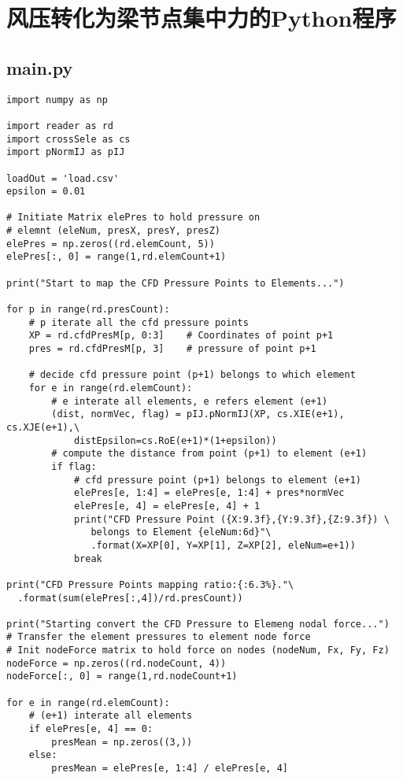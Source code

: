 \chapter{风压转化为梁节点集中力的Python程序}\label{apen:load}

\section{main.py}
\begin{verbatim}
import numpy as np

import reader as rd
import crossSele as cs
import pNormIJ as pIJ

loadOut = 'load.csv'
epsilon = 0.01

# Initiate Matrix elePres to hold pressure on
# elemnt (eleNum, presX, presY, presZ)
elePres = np.zeros((rd.elemCount, 5))
elePres[:, 0] = range(1,rd.elemCount+1)

print("Start to map the CFD Pressure Points to Elements...")

for p in range(rd.presCount):
    # p iterate all the cfd pressure points
    XP = rd.cfdPresM[p, 0:3]    # Coordinates of point p+1
    pres = rd.cfdPresM[p, 3]    # pressure of point p+1
    
    # decide cfd pressure point (p+1) belongs to which element
    for e in range(rd.elemCount):
        # e interate all elements, e refers element (e+1)
        (dist, normVec, flag) = pIJ.pNormIJ(XP, cs.XIE(e+1), cs.XJE(e+1),\
            distEpsilon=cs.RoE(e+1)*(1+epsilon))   
        # compute the distance from point (p+1) to element (e+1)
        if flag:
            # cfd pressure point (p+1) belongs to element (e+1)
            elePres[e, 1:4] = elePres[e, 1:4] + pres*normVec
            elePres[e, 4] = elePres[e, 4] + 1
            print("CFD Pressure Point ({X:9.3f},{Y:9.3f},{Z:9.3f}) \
               belongs to Element {eleNum:6d}"\
               .format(X=XP[0], Y=XP[1], Z=XP[2], eleNum=e+1))
            break

print("CFD Pressure Points mapping ratio:{:6.3%}."\
  .format(sum(elePres[:,4])/rd.presCount))

print("Starting convert the CFD Pressure to Elemeng nodal force...")
# Transfer the element pressures to element node force
# Init nodeForce matrix to hold force on nodes (nodeNum, Fx, Fy, Fz)
nodeForce = np.zeros((rd.nodeCount, 4))
nodeForce[:, 0] = range(1,rd.nodeCount+1)

for e in range(rd.elemCount):
    # (e+1) interate all elements
    if elePres[e, 4] == 0:
        presMean = np.zeros((3,))
    else:
        presMean = elePres[e, 1:4] / elePres[e, 4]


\end{verbatim}
